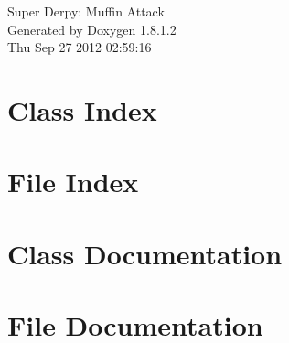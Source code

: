 \documentclass{book}
\begin{document}
\hypersetup{pageanchor=false,citecolor=blue}
\begin{titlepage}
\vspace*{7cm}
\begin{center}
{\Large Super Derpy\-: Muffin Attack }\\
\vspace*{1cm}
{\large Generated by Doxygen 1.8.1.2}\\
\vspace*{0.5cm}
{\small Thu Sep 27 2012 02:59:16}\\
\end{center}
\end{titlepage}
\clearemptydoublepage
{}
\tableofcontents
\clearemptydoublepage
{}
\hypersetup{pageanchor=true,citecolor=blue}
\chapter{Class Index}

\chapter{File Index}

\chapter{Class Documentation}














\chapter{File Documentation}






























\printindex
\end{document}
